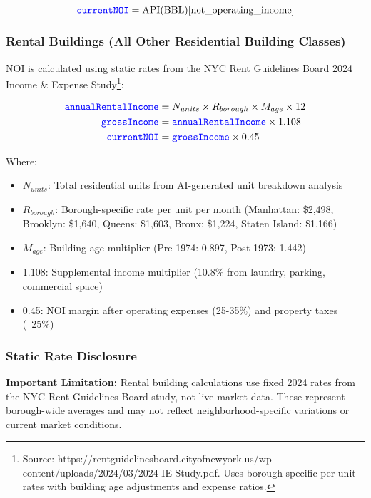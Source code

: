 \documentclass{article}
\newcommand{\code}[1]{\textcolor{blue}{\texttt{#1}}}
\begin{document}
\begin{equation}
\code{currentNOI} = \text{API}(\text{BBL})[\text{net\_operating\_income}]
\end{equation}

\subsubsection{Rental Buildings (All Other Residential Building Classes)}
NOI is calculated using static rates from the NYC Rent Guidelines Board 2024 Income \& Expense Study\footnote{Source: https://rentguidelinesboard.cityofnewyork.us/wp-content/uploads/2024/03/2024-IE-Study.pdf. Uses borough-specific per-unit rates with building age adjustments and expense ratios.}:

\begin{align}
\code{annualRentalIncome} &= N_{units} \times R_{borough} \times M_{age} \times 12 \\
\code{grossIncome} &= \code{annualRentalIncome} \times 1.108 \\
\code{currentNOI} &= \code{grossIncome} \times 0.45
\end{align}

Where:
\begin{itemize}
    \item $N_{units}$: Total residential units from AI-generated unit breakdown analysis
    \item $R_{borough}$: Borough-specific rate per unit per month (Manhattan: \$2,498, Brooklyn: \$1,640, Queens: \$1,603, Bronx: \$1,224, Staten Island: \$1,166)
    \item $M_{age}$: Building age multiplier (Pre-1974: 0.897, Post-1973: 1.442)
    \item 1.108: Supplemental income multiplier (10.8\% from laundry, parking, commercial space)
    \item 0.45: NOI margin after operating expenses (25-35\%) and property taxes (~25\%)
\end{itemize}

\subsubsection{Static Rate Disclosure}
\textbf{Important Limitation:} Rental building calculations use fixed 2024 rates from the NYC Rent Guidelines Board study, not live market data. These represent borough-wide averages and may not reflect neighborhood-specific variations or current market conditions.
\end{document}
